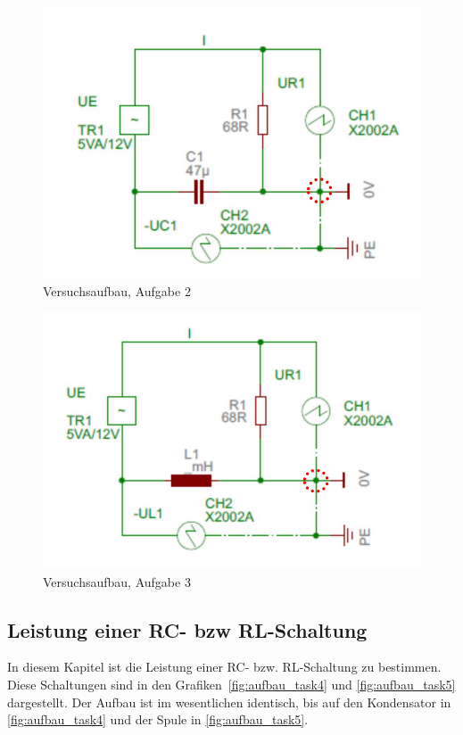 \documentclass{article}
\begin{document}
\begin{figure}[H]
\centering
\caption{Versuchsaufbau, Aufgabe 2}
\label{fig:aufbau_task2}
\includegraphics[scale=1]{bilder/aufbau_task2.png}
\end{figure}



\begin{figure}[H]
\centering
\caption{Versuchsaufbau, Aufgabe 3}
\label{fig:aufbau_task3}
\includegraphics[scale=1]{bilder/aufbau_task3.png}
\end{figure}


\subsection{Leistung einer RC- bzw RL-Schaltung}

In diesem Kapitel ist die Leistung einer RC- bzw. RL-Schaltung zu bestimmen. Diese Schaltungen sind in den Grafiken~\ref{fig:aufbau_task4} und \ref{fig:aufbau_task5} dargestellt. Der Aufbau ist im wesentlichen identisch, bis auf den Kondensator in \ref{fig:aufbau_task4} und der Spule in \ref{fig:aufbau_task5}.
\end{document}
